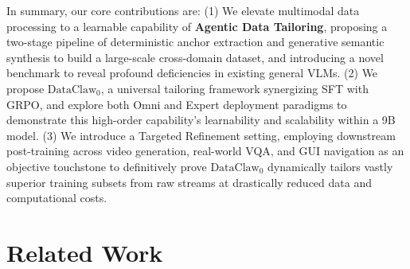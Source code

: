 \documentclass{llmxive}
\begin{document}
In summary, our core contributions are: 
(1) We elevate multimodal data processing to a learnable capability of \textbf{Agentic Data Tailoring}, proposing a two-stage pipeline of deterministic anchor extraction and generative semantic synthesis to build a large-scale cross-domain dataset, and introducing a novel benchmark to reveal profound deficiencies in existing general VLMs. 
(2) We propose $\text{$\text{DataClaw}_0$}$, a universal tailoring framework synergizing SFT with GRPO, and explore both Omni and Expert deployment paradigms to demonstrate this high-order capability's learnability and scalability within a 9B model. 
(3) We introduce a Targeted Refinement setting, employing downstream post-training across video generation, real-world VQA, and GUI navigation as an objective touchstone to definitively prove $\text{DataClaw}_0$ dynamically tailors vastly superior training subsets from raw streams at drastically reduced data and computational costs.
\section{Related Work}
\end{document}
